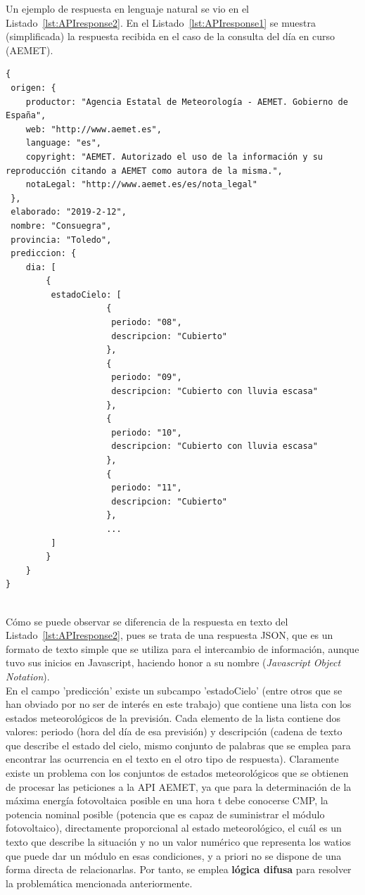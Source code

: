 Un ejemplo de respuesta en lenguaje natural se vio en el Listado~\ref{lst:APIresponse2}. En el Listado~\ref{lst:APIresponse1} se muestra (simplificada) la respuesta recibida en el caso de la consulta del día en curso (\textcopyright AEMET).
\begin{lstlisting}[numbers=none,float=ht,caption={Ejemplo de respuesta de la API-AEMET para el día en curso},label={lst:APIresponse1}]
{
 origen: {
	productor: "Agencia Estatal de Meteorología - AEMET. Gobierno de España",
	web: "http://www.aemet.es",
	language: "es",
	copyright: "AEMET. Autorizado el uso de la información y su reproducción citando a AEMET como autora de la misma.",
	notaLegal: "http://www.aemet.es/es/nota_legal"
 },
 elaborado: "2019-2-12",
 nombre: "Consuegra",
 provincia: "Toledo",
 prediccion: {
 	dia: [
		{
		 estadoCielo: [
					{
					 periodo: "08",
					 descripcion: "Cubierto"
					},
					{
					 periodo: "09",
					 descripcion: "Cubierto con lluvia escasa"
					},
					{
					 periodo: "10",
					 descripcion: "Cubierto con lluvia escasa"
					},
					{
					 periodo: "11",
					 descripcion: "Cubierto"
					},
					...
		 ]
		}
	}
}
\end{lstlisting}
\\

Cómo se puede observar se diferencia de la respuesta en texto del Listado~\ref{lst:APIresponse2}, pues se trata de una respuesta \gls{JSON}, que es un formato de texto simple que se utiliza para el intercambio de información, aunque tuvo sus inicios en Javascript, haciendo honor a su nombre (\textit{Javascript Object Notation}).\\
En el campo 'predicción' existe un subcampo 'estadoCielo' (entre otros que se han obviado por no ser de interés en este trabajo) que contiene una lista con los estados meteorológicos de la previsión. Cada elemento de la lista contiene dos valores: periodo (hora del día de esa previsión) y descripción (cadena de texto que describe el estado del cielo, mismo conjunto de palabras que se emplea para encontrar las ocurrencia en el texto en el otro tipo de respuesta). Claramente existe un problema con los conjuntos de estados meteorológicos que se obtienen de procesar las peticiones a la \gls{API} \gls{AEMET}, ya que para la determinación de la máxima energía fotovoltaica posible en una hora t debe conocerse \gls{CMP}, la potencia nominal posible (potencia que es capaz de suministrar el módulo fotovoltaico), directamente proporcional al estado meteorológico, el cuál es un texto que describe la situación y no un valor numérico que representa los watios que puede dar un módulo en esas condiciones, y a priori no se dispone de una forma directa de relacionarlas. Por tanto, se emplea \textbf{lógica difusa} para resolver la problemática mencionada anteriormente.
